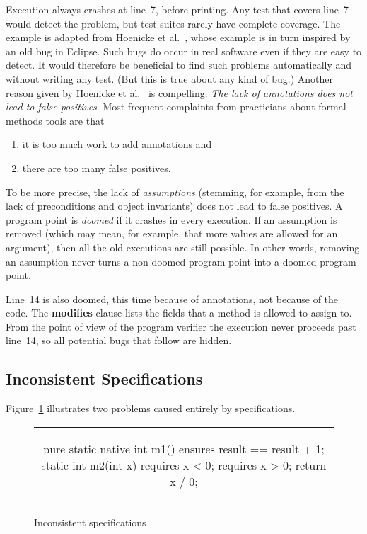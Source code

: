 \documentclass[a4paper]{article}
\newcommand{\bc}{\begin{figure}\centering\begin{tabular}{c}} %
\newcommand{\ec}[2]{\end{tabular}\caption{#1}\label{#2}\end{figure}} %
\theoremstyle{slanted}
\theoremstyle{definition}
\theoremstyle{remark}
\begin{document}
Execution always crashes at line~7, before printing. Any test
that covers line~7 would detect the problem, but test suites
rarely have complete coverage. The example is adapted from
Hoenicke et al.~\cite{hoenicke2009}, whose example is in turn
inspired by an old bug in Eclipse. Such bugs do occur in real
software even if they are easy to detect. It would therefore
be beneficial to find such problems automatically and without
writing any test. (But this is true about any kind of bug.)
Another reason given by Hoenicke et al.~\cite{hoenicke2009} is
compelling: \emph{The lack of annotations does not lead to false
positives}. Most frequent complaints from practicians about
formal methods tools are that
\begin{enumerate}
\item it is too much work to add annotations and
\item there are too many false positives.
\end{enumerate}
To be more precise, the lack of \emph{assumptions} (stemming,
for example, from the lack of preconditions and object
invariants) does not lead to false positives. A program point is
\emph{doomed} if it crashes in every execution. If an assumption
is removed (which may mean, for example, that more values are
allowed for an argument), then all the old executions are still
possible. In other words, removing an assumption never turns a
non-doomed program point into a doomed program point.

Line~14 is also doomed, this time because of annotations, not
because of the code. The \textbf{modifies} clause lists the
fields that a method is allowed to assign to. From the point of
view of the program verifier the execution never proceeds past
line~14, so all potential bugs that follow are hidden.

\subsection{Inconsistent Specifications}

Figure~\ref{fig:ra-bad-spec-ex} illustrates two problems caused
entirely by specifications.

\bc
\begin{jml}
pure static native int m1()
  ensures result == result + 1;
static int m2(int x)
  requires x < 0;
  requires x > 0;
{
  return x / 0;
}
\end{jml}
\ec{Inconsistent specifications}{fig:ra-bad-spec-ex}
\end{document}
